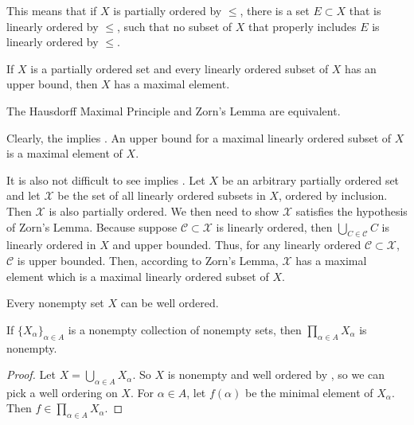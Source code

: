 This means that if $X$ is partially ordered by $\le$, there is a set $E \subset X$ that is linearly ordered by $\le$, such that no subset of $X$ that properly includes $E$ is linearly ordered by $\le$.

\begin{lemma}
    If $X$ is a partially ordered set and every linearly ordered subset of $X$ has an upper bound, then $X$ has a maximal element.
\end{lemma}

The Hausdorff Maximal Principle and Zorn's Lemma are equivalent.

Clearly, the  implies .
An upper bound for a maximal linearly ordered subset of $X$ is a maximal element of $X$.

It is also not difficult to see  implies . 
Let $X$ be an arbitrary partially ordered set and let $\mathcal{X}$ be the set of all linearly ordered subsets in $X$, ordered by inclusion.
Then $\mathcal{X}$ is also partially ordered.
We then need to show $\mathcal{X}$ satisfies the hypothesis of Zorn's Lemma.
Because suppose $\mathcal{C} \subset \mathcal{X}$ is linearly ordered, then $\bigcup_{C \in \mathcal{C}} C$ is linearly ordered in $X$ and upper bounded.
Thus, for any linearly ordered $\mathcal{C} \subset \mathcal{X}$, $\mathcal{C}$ is upper bounded.
Then, according to Zorn's Lemma, $\mathcal{X}$ has a maximal element which is a maximal linearly ordered subset of $X$.


\begin{theorem}
    Every nonempty set $X$ can be well ordered.
\end{theorem}

\begin{theorem}
    If $\{ X_{\alpha} \}_{\alpha \in A}$ is a nonempty collection of nonempty sets, then $\prod_{\alpha \in A} X_{\alpha}$ is nonempty.
\end{theorem}

\begin{proof}
    Let $X = \bigcup_{\alpha \in A} X_\alpha$.
    So $X$ is nonempty and well ordered by , so we can pick a well ordering on $X$.
    For $\alpha \in A$, let $f(\alpha)$ be the minimal element of $X_\alpha$.
    Then $f \in \prod_{\alpha \in A} X_\alpha$.
\end{proof}

